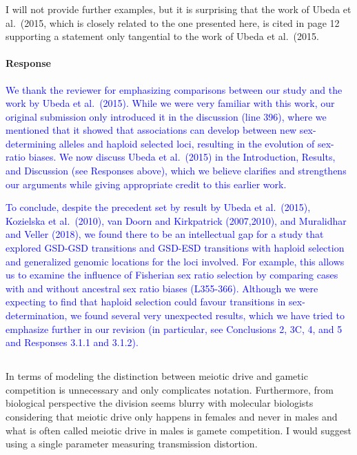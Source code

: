 \documentclass[10pt,letterpaper]{article}
\begin{document}
\noindent\subsubsection{}
I will not provide further examples, but it is surprising that the work of Ubeda et al.\ (2015, which is closely related to the one presented here, is cited in page 12 supporting a statement only tangential to the work of Ubeda et al.\ (2015.

\noindent\paragraph{Response}
\textcolor{blue}{
We thank the reviewer for emphasizing comparisons between our study and the work by Ubeda et al.\ (2015). 
While we were very familiar with this work, our original submission only introduced it in the discussion (line 396), where we mentioned that it showed that associations can develop between new sex-determining alleles and haploid selected loci, resulting in the evolution of sex-ratio biases.
We now discuss Ubeda et al.\ (2015) in the Introduction, Results, and Discussion (see Responses above), which we believe clarifies and strengthens our arguments while giving appropriate credit to this earlier work.
}

\textcolor{blue}{To conclude, despite the precedent set by result by Ubeda et al.\ (2015), Kozielska et al.\ (2010), van Doorn and Kirkpatrick (2007,2010), and Muralidhar and Veller (2018), we found there to be an intellectual gap for a study that explored GSD-GSD transitions and GSD-ESD transitions with haploid selection and generalized genomic locations for the loci involved. 
For example, this allows us to examine the influence of Fisherian sex ratio selection by comparing cases with and without ancestral sex ratio biases (L355-366). 
Although we were expecting to find that haploid selection could favour transitions in sex-determination, we found several very unexpected results, which we have tried to emphasize further in our revision (in particular, see Conclusions 2, 3C, 4, and 5 and Responses 3.1.1 and 3.1.2). 
}

\noindent\subsection{}
In terms of modeling the distinction between meiotic drive and gametic competition is unnecessary and only complicates notation. Furthermore, from biological perspective the division seems blurry with molecular biologists considering that meiotic drive only happens in females and never in males and what is often called meiotic drive in males is gamete competition. I would suggest using a single parameter measuring transmission distortion.
\end{document}
